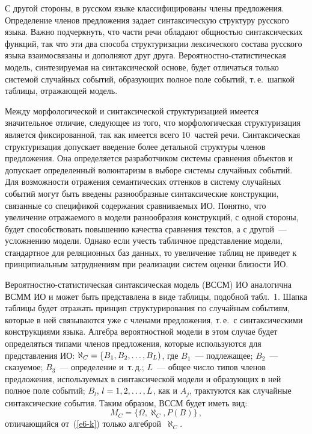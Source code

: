\begin{multicols}{2}
   С другой стороны, в русском языке классифицированы члены 
предложения. Определение членов предложения задает синтаксическую 
структуру русского языка. Важно подчеркнуть, что части речи обладают 
общностью синтаксических функций, так что эти два способа 
структуризации лексического состава русского языка взаимосвязаны и 
дополняют друг друга. Вероятностно-статистическая модель, синтезируемая 
на синтаксической основе, будет отличаться только системой случайных 
событий, образующих полное поле событий, т.\,е.\ шапкой таблицы, 
отражающей модель. 
   
   Между морфологической и синтаксической структуризацией имеется 
значительное отличие, сле\-ду\-ющее из того, что морфологическая 
структури\-за\-ция является фиксированной, так как имеется всего 10~час\-тей 
речи. Синтаксическая структуризация допускает введение более детальной 
структуры членов предложения. Она определяется разработчиком системы 
сравнения объектов и допускает определенный волюнтаризм в выборе 
системы случайных событий. Для возможности отражения семантических 
оттенков в систему случайных событий могут быть введены разнообразные 
синтаксические конструкции, связанные со спецификой содержания 
сравниваемых ИО. Понятно, что увеличение отражаемого в модели 
разнообразия конструкций, с одной стороны, будет способствовать 
повышению качества сравнения текстов, а с другой~--- усложнению модели. 
Однако если учесть табличное представление модели, стандартное для 
реляционных баз данных, то увеличение таблиц не приведет к 
принципиальным затруднениям при реализации систем оценки близости ИО. 
   
   Вероятностно-статистическая синтаксическая модель (ВССМ) ИО 
аналогична ВСММ ИО и может быть представлена в виде таблицы, подобной 
табл.~1. Шапка таблицы будет отражать принцип 
структурирования по случайным событиям, которые в ней связываются уже с 
членами предложения, т.\,е.\ с синтаксическими конструкциями языка. 
Алгебра вероятностной модели в этом случае будет определяться типами 
членов предложения, которые используются для представления ИО: 
$\aleph_C \hm= \{B_1, B_2, \ldots , B_L)$, где $B_1$~--- подлежащее; $B_2$~--- 
сказуемое; $B_3$~--- определение и~т.\,д.;
   $L$~--- общее число типов членов предложения, используемых в 
синтаксической модели и образующих в ней полное поле событий; 
   $B_l$, $l \hm= 1, 2, \ldots , L$, как и $A_j$, трактуются как случайные 
синтаксические события. Таким образом, ВССМ будет иметь вид: 
\begin{equation}
M_C = \{\Omega, \aleph_C,P(B)\}\,,
\label{e9-k}
\end{equation}
отличающийся от~(\ref{e6-k}) только алгеброй~$\aleph_C$.


\end{multicols}

